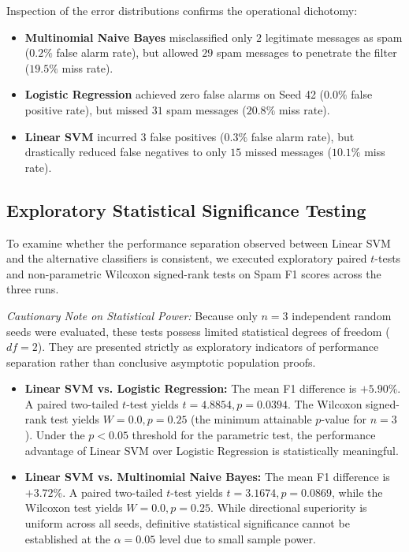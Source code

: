 \documentclass[conference]{IEEEtran}
\begin{document}
Inspection of the error distributions confirms the operational dichotomy:
\begin{itemize}
    \item \textbf{Multinomial Naive Bayes} misclassified only $2$ legitimate messages as spam ($0.2\%$ false alarm rate), but allowed $29$ spam messages to penetrate the filter ($19.5\%$ miss rate).
    \item \textbf{Logistic Regression} achieved zero false alarms on Seed 42 ($0.0\%$ false positive rate), but missed $31$ spam messages ($20.8\%$ miss rate).
    \item \textbf{Linear SVM} incurred $3$ false positives ($0.3\%$ false alarm rate), but drastically reduced false negatives to only $15$ missed messages ($10.1\%$ miss rate).
\end{itemize}

\subsection{Exploratory Statistical Significance Testing}
To examine whether the performance separation observed between Linear SVM and the alternative classifiers is consistent, we executed exploratory paired $t$-tests and non-parametric Wilcoxon signed-rank tests on Spam F1 scores across the three runs.

\textit{Cautionary Note on Statistical Power:} Because only $n = 3$ independent random seeds were evaluated, these tests possess limited statistical degrees of freedom ($df = 2$). They are presented strictly as exploratory indicators of performance separation rather than conclusive asymptotic population proofs.
\begin{itemize}
    \item \textbf{Linear SVM vs. Logistic Regression:} The mean F1 difference is $+5.90\%$. A paired two-tailed $t$-test yields $t = 4.8854, p = 0.0394$. The Wilcoxon signed-rank test yields $W = 0.0, p = 0.25$ (the minimum attainable $p$-value for $n=3$). Under the $p < 0.05$ threshold for the parametric test, the performance advantage of Linear SVM over Logistic Regression is statistically meaningful.
    \item \textbf{Linear SVM vs. Multinomial Naive Bayes:} The mean F1 difference is $+3.72\%$. A paired two-tailed $t$-test yields $t = 3.1674, p = 0.0869$, while the Wilcoxon test yields $W = 0.0, p = 0.25$. While directional superiority is uniform across all seeds, definitive statistical significance cannot be established at the $\alpha = 0.05$ level due to small sample power.
\end{itemize}
\end{document}
